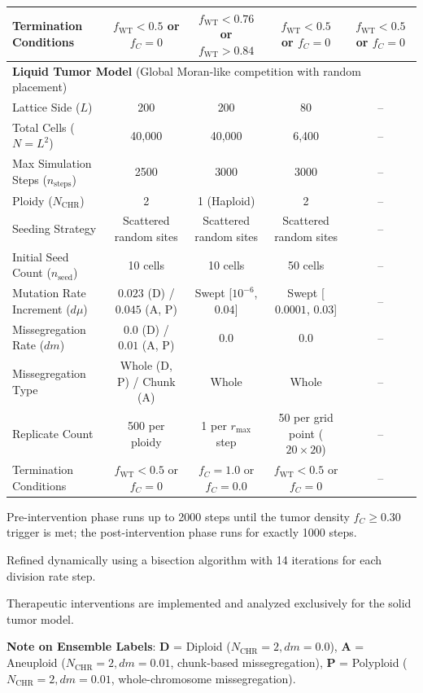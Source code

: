 \documentclass[11pt,a4paper]{article}
\begin{document}
\begin{table}[htbp]
{\begin{threeparttable}
\begin{tabular}{lcccc}
Termination Conditions & $f_{\text{WT}} < 0.5$ or $f_C = 0$ & $f_{\text{WT}} < 0.76$ or $f_{\text{WT}} > 0.84$ & $f_{\text{WT}} < 0.5$ or $f_C = 0$ & $f_{\text{WT}} < 0.5$ or $f_C = 0$ \\
\midrule
\multicolumn{5}{l}{\textbf{Liquid Tumor Model} (Global Moran-like competition with random placement)} \\
Lattice Side ($L$) & 200 & 200 & 80 & --\tnote{c} \\
Total Cells ($N = L^2$) & 40,000 & 40,000 & 6,400 & -- \\
Max Simulation Steps ($n_{\text{steps}}$) & 2500 & 3000 & 3000 & -- \\
Ploidy ($N_{\text{CHR}}$) & 2 & 1 (Haploid) & 2 & -- \\
Seeding Strategy & Scattered random sites & Scattered random sites & Scattered random sites & -- \\
Initial Seed Count ($n_{\text{seed}}$) & 10 cells & 10 cells & 50 cells & -- \\
Mutation Rate Increment ($d\mu$) & $0.023$ (D) / $0.045$ (A, P) & Swept [$10^{-6}$, $0.04$]\tnote{b} & Swept [$0.0001$, $0.03$] & -- \\
Missegregation Rate ($dm$) & $0.0$ (D) / $0.01$ (A, P) & $0.0$ & $0.0$ & -- \\
Missegregation Type & Whole (D, P) / Chunk (A) & Whole & Whole & -- \\
Replicate Count & 500 per ploidy & 1 per $r_{\max}$ step & 50 per grid point ($20 \times 20$) & -- \\
Termination Conditions & $f_{\text{WT}} < 0.5$ or $f_C = 0$ & $f_C = 1.0$ or $f_C = 0.0$ & $f_{\text{WT}} < 0.5$ or $f_C = 0$ & -- \\
\bottomrule
\end{tabular}
\begin{tablenotes}
\small
\item[a] Pre-intervention phase runs up to 2000 steps until the tumor density $f_C \ge 0.30$ trigger is met; the post-intervention phase runs for exactly 1000 steps.
\item[b] Refined dynamically using a bisection algorithm with 14 iterations for each division rate step.
\item[c] Therapeutic interventions are implemented and analyzed exclusively for the solid tumor model.
\item \textbf{Note on Ensemble Labels}: \textbf{D} = Diploid ($N_{\text{CHR}}=2, dm=0.0$), \textbf{A} = Aneuploid ($N_{\text{CHR}}=2, dm=0.01$, chunk-based missegregation), \textbf{P} = Polyploid ($N_{\text{CHR}}=2, dm=0.01$, whole-chromosome missegregation).
\end{tablenotes}
\end{threeparttable}
}%
\end{table}
\end{document}
